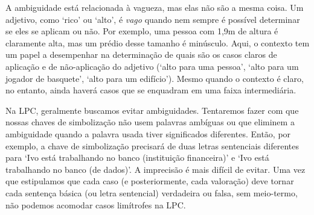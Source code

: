A ambiguidade está relacionada à vagueza, mas elas não são a mesma coisa. Um adjetivo, como `rico' ou `alto', é \textit{vago} quando nem sempre é possível determinar se eles se aplicam ou não. Por exemplo, uma pessoa com 1,9m de altura é claramente alta, mas um prédio desse tamanho é minúsculo. Aqui, o contexto tem um papel a desempenhar na determinação de quais são os casos claros de aplicação e de não-aplicação do adjetivo (`alto para uma pessoa', `alto para um jogador de basquete', `alto para um edifício'). Mesmo quando o contexto é claro, no entanto, ainda haverá casos que se enquadram em uma faixa intermediária.

Na LPC, geralmente buscamos evitar ambiguidades. Tentaremos fazer com que nossas chaves de simbolização não usem palavras ambíguas ou que eliminem a ambiguidade quando a palavra usada tiver significados diferentes. Então, por exemplo, a chave de simbolização precisará de duas letras sentenciais diferentes para `Ivo está trabalhando no banco (instituição financeira)' e `Ivo está trabalhando no banco (de dados)'. A imprecisão é mais difícil de evitar. Uma vez que estipulamos que cada caso (e posteriormente, cada valoração) deve tornar cada sentença básica (ou letra sentencial) verdadeira ou falsa, sem meio-termo, não podemos acomodar casos limítrofes na LPC. 

